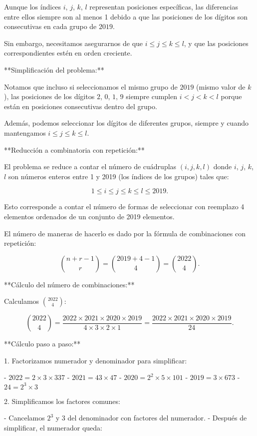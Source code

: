 \documentclass[11pt]{scrartcl}
\begin{document}
\begin{problem}
\begin{solu}
Aunque los índices $i$, $j$, $k$, $l$ representan posiciones específicas, las diferencias entre ellos siempre son al menos 1 debido a que las posiciones de los dígitos son consecutivas en cada grupo de $2019$.

Sin embargo, necesitamos asegurarnos de que $i \leq j \leq k \leq l$, y que las posiciones correspondientes estén en orden creciente.

**Simplificación del problema:**

Notamos que incluso si seleccionamos el mismo grupo de $2019$ (mismo valor de $k$), las posiciones de los dígitos $2$, $0$, $1$, $9$ siempre cumplen $i < j < k < l$ porque están en posiciones consecutivas dentro del grupo.

Además, podemos seleccionar los dígitos de diferentes grupos, siempre y cuando mantengamos $i \leq j \leq k \leq l$.

**Reducción a combinatoria con repetición:**

El problema se reduce a contar el número de cuádruplas $(i, j, k, l)$ donde $i$, $j$, $k$, $l$ son números enteros entre 1 y 2019 (los índices de los grupos) tales que:

$$
1 \leq i \leq j \leq k \leq l \leq 2019.
$$

Esto corresponde a contar el número de formas de seleccionar con reemplazo 4 elementos ordenados de un conjunto de 2019 elementos.

El número de maneras de hacerlo es dado por la fórmula de combinaciones con repetición:

$$
\binom{n + r - 1}{r} = \binom{2019 + 4 - 1}{4} = \binom{2022}{4}.
$$

**Cálculo del número de combinaciones:**

Calculamos $\binom{2022}{4}$:

$$
\binom{2022}{4} = \frac{2022 \times 2021 \times 2020 \times 2019}{4 \times 3 \times 2 \times 1} = \frac{2022 \times 2021 \times 2020 \times 2019}{24}.
$$

**Cálculo paso a paso:**

1. Factorizamos numerador y denominador para simplificar:

   - $2022 = 2 \times 3 \times 337$
   - $2021 = 43 \times 47$
   - $2020 = 2^2 \times 5 \times 101$
   - $2019 = 3 \times 673$
   - $24 = 2^3 \times 3$

2. Simplificamos los factores comunes:

   - Cancelamos $2^3$ y $3$ del denominador con factores del numerador.
   - Después de simplificar, el numerador queda:


\end{solu}
\end{problem}
\end{document}
